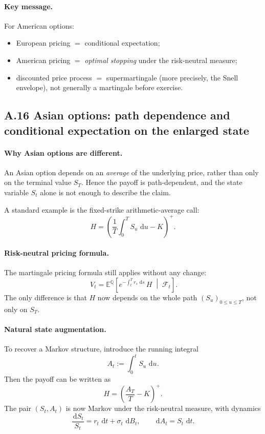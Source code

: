 \documentclass[11pt]{article}
\newcommand{\Qbb}{\mathbb{Q}}
\newcommand{\E}{\mathbb{E}}
\newcommand{\dd}{\,\mathrm{d}}
\newcommand{\1}{\mathbf{1}}
\begin{document}
\paragraph{Key message.}
For American options:
\begin{itemize}[leftmargin=1.4em]
    \item European pricing \(=\) conditional expectation;
    \item American pricing \(=\) \emph{optimal stopping} under the risk-neutral measure;
    \item discounted price process \(=\) supermartingale (more precisely, the Snell envelope), not generally a martingale before exercise.
\end{itemize}


\subsection*{A.16 Asian options: path dependence and conditional expectation on the enlarged state}

\paragraph{Why Asian options are different.}
An Asian option depends on an \emph{average} of the underlying price, rather than only on the terminal value \(S_T\).
Hence the payoff is path-dependent, and the state variable \(S_t\) alone is not enough to describe the claim.

A standard example is the fixed-strike arithmetic-average call:
\[
H=\left(\frac{1}{T}\int_0^T S_u\,\dd u - K\right)^+.
\]

\paragraph{Risk-neutral pricing formula.}
The martingale pricing formula still applies without any change:
\[
\boxed{
\ V_t
=
\E^{\Qbb}\!\left[
e^{-\int_t^T r_s\,\dd s}\,H
\;\middle|\;
\mathcal F_t
\right].
}
\]
The only difference is that \(H\) now depends on the whole path \((S_u)_{0\le u\le T}\), not only on \(S_T\).

\paragraph{Natural state augmentation.}
To recover a Markov structure, introduce the running integral
\[
A_t:=\int_0^t S_u\,\dd u.
\]
Then the payoff can be written as
\[
H=\left(\frac{A_T}{T}-K\right)^+.
\]
The pair \((S_t,A_t)\) is now Markov under the risk-neutral measure, with dynamics
\[
\frac{\dd S_t}{S_t}=r_t\,\dd t+\sigma_t\,\dd B_t,
\qquad
\dd A_t=S_t\,\dd t.
\]
\end{document}
